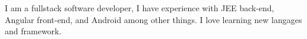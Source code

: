 

\begin{cvparagraph}

I am a fullstack software developer, I have experience with JEE back-end, Angular front-end, and Android among other things. I love learning new langages and framework.
\end{cvparagraph}
